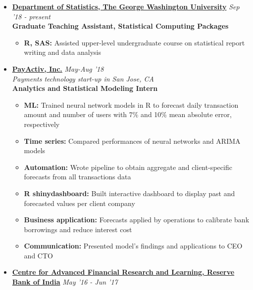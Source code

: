 \documentclass[10pt,a4paper]{article}
\begin{document}
\begin{itemize}
\item {\href{https://statistics.columbian.gwu.edu/}{\fontsize{11}{11}\selectfont\textbf{Department of Statistics, The George Washington University}}} \hfill \textit{Sep '18 - present}\\
	\textbf{Graduate Teaching Assistant, Statistical Computing Packages}
	\vspace{-0.5em}
		\begin{itemize}
		\itemsep-0.15em
			\item \textbf{R, SAS: }Assisted upper-level undergraduate course on statistical report writing and data analysis
		\vspace{-0.35em}
		\end{itemize}

\item {\href{https://www.payactiv.com/}{\fontsize{11}{11}\selectfont\textbf{PayActiv, Inc.}}} \hfill \textit{May-Aug '18}\\
	\textit{Payments technology start-up in San Jose, CA}\\
	\textbf{Analytics and Statistical Modeling Intern}	
	\vspace{-0.5em}
		\begin{itemize}
		\itemsep-0.15em
			\item \textbf{ML: }Trained neural network models in R to forecast daily transaction amount and number of users with 7\% and 10\% mean absolute error, respectively
			\item \textbf{Time series: }Compared performances of neural networks and ARIMA models
			\item \textbf{Automation: }Wrote pipeline to obtain aggregate and client-specific forecasts from all transactions data
			\item \textbf{R shinydashboard: }Built interactive dashboard to display past and forecasted values per client company
			\item \textbf{Business application: }Forecasts applied by operations to calibrate bank borrowings and reduce interest cost
			\item \textbf{Communication: }Presented model's findings and applications to CEO and CTO
			\vspace{-0.35em}
		\end{itemize}
\item{\href{http://www.cafral.org.in/}{\fontsize{11}{11}\selectfont\textbf{Centre for Advanced Financial Research and Learning, Reserve Bank of India}}} \hfill \textit{May '16 - Jun '17} \\

\end{itemize}
\end{document}
